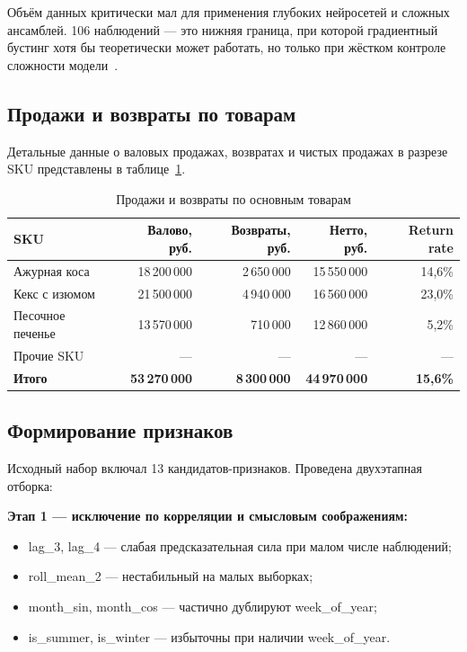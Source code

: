 Объём данных критически мал для применения глубоких нейросетей и сложных ансамблей. 106 наблюдений --- это нижняя граница, при которой градиентный бустинг хотя бы теоретически может работать, но только при жёстком контроле сложности модели~\cite{makridakis2018m4}.

\subsection{Продажи и возвраты по товарам}

Детальные данные о валовых продажах, возвратах и чистых продажах в разрезе SKU представлены в таблице~\ref{tab:sales_by_sku}.

\begin{table}[H]
\centering
\caption{Продажи и возвраты по основным товарам}
\label{tab:sales_by_sku}
\begin{tabular}{lrrrr}
\toprule
\textbf{SKU} & \textbf{Валово, руб.} & \textbf{Возвраты, руб.} & \textbf{Нетто, руб.} & \textbf{Return rate} \\
\midrule
Ажурная коса & 18\,200\,000 & 2\,650\,000 & 15\,550\,000 & 14,6\% \\
Кекс с изюмом & 21\,500\,000 & 4\,940\,000 & 16\,560\,000 & 23,0\% \\
Песочное печенье & 13\,570\,000 & 710\,000 & 12\,860\,000 & 5,2\% \\
\midrule
Прочие SKU & --- & --- & --- & --- \\
\midrule
\textbf{Итого} & \textbf{53\,270\,000} & \textbf{8\,300\,000} & \textbf{44\,970\,000} & \textbf{15,6\%} \\
\bottomrule
\end{tabular}
\end{table}

\subsection{Формирование признаков}

Исходный набор включал 13 кандидатов-признаков. Проведена двухэтапная отборка:

\textbf{Этап 1 --- исключение по корреляции и смысловым соображениям:}
\begin{itemize}
  \item lag\_3, lag\_4 --- слабая предсказательная сила при малом числе наблюдений;
  \item roll\_mean\_2 --- нестабильный на малых выборках;
  \item month\_sin, month\_cos --- частично дублируют week\_of\_year;
  \item is\_summer, is\_winter --- избыточны при наличии week\_of\_year.
\end{itemize}

